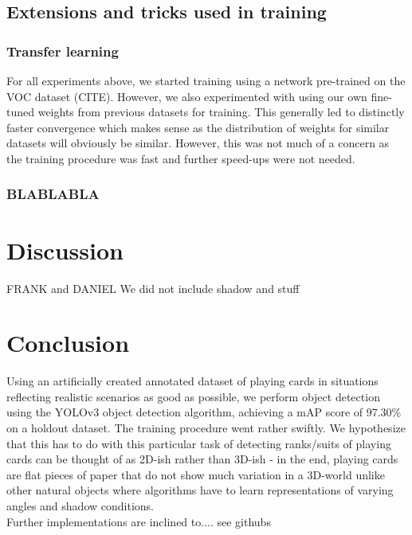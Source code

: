 \documentclass[a4paper]{article}
\begin{document}
\subsection*{Extensions and tricks used in training}
\subsubsection*{Transfer learning}
For all experiments above, we started training using a network pre-trained on the VOC dataset (CITE). However, we also experimented with using our own fine-tuned weights from previous datasets for training. This generally led to distinctly faster convergence which makes sense as the distribution of weights for similar datasets will obviously be similar. However, this was not much of a concern as the training procedure was fast and further speed-ups were not needed.
\subsubsection*{BLABLABLA}
\section{Discussion}
FRANK and DANIEL
We did not include shadow and stuff
\section{Conclusion}
Using an artificially created annotated dataset of playing cards in situations reflecting realistic scenarios as good as possible, we perform object detection using the YOLOv3 object detection algorithm, achieving a mAP score of 97.30\% on a holdout dataset. 
The training procedure went rather swiftly. We hypothesize that this has to do with this particular task of detecting ranks/suits of playing cards can be thought of as 2D-ish rather than 3D-ish - in the end, playing cards are flat pieces of paper that do not show much variation in a 3D-world unlike other natural objects where algorithms have to learn representations of varying angles and shadow conditions. \\
Further implementations are inclined to.... see githubs
\end{document}
